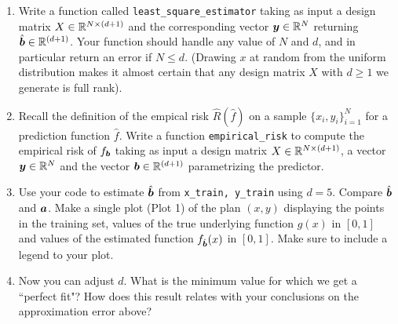 \documentclass{article}
\newcommand{\bb}{b}
\begin{document}
\begin{enumerate}
\setcounter{enumi}{\value{saveenum}}
    \item Write a function called \texttt{least\_square\_estimator} taking as input a design matrix $X \in {\mathbb{R}}^{N \times (d + 1)}$ and the corresponding vector  $\boldsymbol{y} \in {\mathbb{R}}^N$ returning $\hat{\boldsymbol{b}} \in {\mathbb{R}}^{(d + 1)}$. Your function should handle any value of $N$ and $d$, and in particular return an error if $N \leq d$. (Drawing $x$ at random from the uniform distribution makes it almost certain that any design matrix $X$ with $d \geq 1$ we generate is full rank).
    
    \item Recall the definition of the empical risk $\hat{R}(\hat{f})$ on a sample $\{x_i, y_i\}_{i=1}^N$ for a prediction function $\hat{f}$. Write a function \texttt{empirical\_risk} to compute the empirical risk of $f_{\bs \bb}$ taking as input a design matrix $X \in {\mathbb{R}}^{N \times (d + 1)}$, a vector $\boldsymbol{y} \in {\mathbb{R}}^N$ and the vector  $\bs \bb \in \sR^{(d+1)}$ parametrizing the predictor.
    
    \item Use your code to estimate $\hat{\bs \bb}$ from \texttt{x\_train, y\_train} using $d=5$. Compare $\hat{\boldsymbol{b}}$ and $\boldsymbol{a}$. Make a single plot (Plot 1) of the plan $(x,y)$ displaying the points in the training set, values of the true underlying function $g(x)$ in $[0,1]$ and values of the estimated function $f_{\hat{\bs \bb}}(x)$ in $[0,1]$. Make sure to include a legend to your plot.
    
    \item Now you can adjust $d$. What is the minimum value for which we get a ``perfect fit"? How does this result relates with your conclusions on the approximation error above?
    
\setcounter{saveenum}{\value{enumi}}    
\end{enumerate}    
\end{document}
